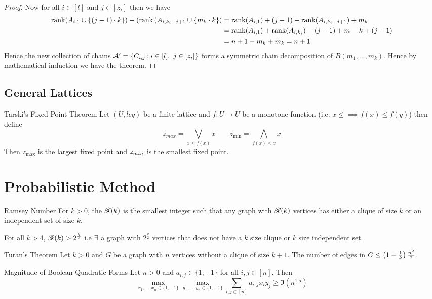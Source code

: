 \begin{proof}
Now for all $i\in[l]$ and  $j\in[z_i]$ then we have \begin{align*}
	\operatorname{rank}(A_{i,1}\cup\{(j-1)\cdot k\})+(\operatorname{rank} \left(A_{i,k_i-j+1}\cup\{m_k\cdot k\}\right)&= \operatorname{rank}(A_{i,1})+(j-1)+\operatorname{rank}(A_{i,k_i-j+1})+m_k\\
	& = \operatorname{rank}(A_{i,1})+\operatorname{rank}(A_{i,k_i})-(j-1)+m-k+(j-1)\\
	& = n+1-m_k+m_k=n+1
\end{align*}
Hence the new collection of chains $\mathcal{A}'=\{C_{i,j}\colon i\in[l],\ j\in[z_i]\}$ forms a symmetric chain decomposition of $B(m_1,\dots, m_k)$. Hence by mathematical induction we have the theorem.
\end{proof}
\subsection{General Lattices}


\begin{Theorem}{Tarski's Fixed Point Theorem}{}
	Let $(U,leq)$ be a finite lattice and $f:U\to U$ be a monotone function (i.e. $x\leq\implies f(x)\leq f(y)$) then define $$z_{max}=\bigvee_{x\leq f(x)}x\qquad z_{\min}=\bigwedge_{f(x)\leq x}x$$Then $z_{\max}$ is the largest fixed point and $z_{\\min}$ is the smallest fixed point.
\end{Theorem}
\section{Probabilistic Method}
\begin{Definition}{Ramsey Number}{}
	For $k>0$, the ${\mathscr{R}}(k)$ is the smallest integer such that any graph with ${\mathscr{R}}(k)$ vertices  has either a clique of size $k$ or an independent set of size $k$.
\end{Definition}
\begin{lemma}{}{}
	For all $k>4$, ${\mathscr{R}}(k)>2^{\frac{k}2}$ i.e  $\exists$ a graph with $2^{\frac{k}2}$ vertices that does not have a $k$ size clique or $k$ size independent set.
\end{lemma}
\begin{Theorem}{Turan's Theorem}{}
	Let $k>0$ and $G$ be a graph with $n$ vertices without a clique of size $k+1$. The number of edges in $G \leq \left(1-\frac1k\right)\frac{n^2}{2}$. 
\end{Theorem}
\begin{lemma}{Magnitude of Boolean Quadratic Forms}{}
	Let $n>0$ and $a_{i,j}\in\{1,-1\}$ for all $i,j\in[n]$. Then $$\max_{x_1,\dots, x_n\in \{1,-1\}}\max_{y_1,\dots, y_n\in \{1,-1\}}\sum_{i,j\in[n]}a_{i,j}x_iy_j\geq \Im(n^{1.5})$$
\end{lemma}
